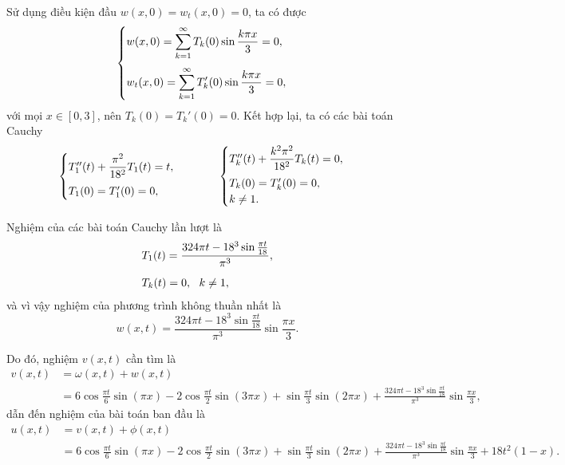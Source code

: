 \documentclass[10pt, a4paper]{article}
\begin{document}
	Sử dụng điều kiện đầu $w(x,0)=w_t(x,0)=0$, ta có được $$\begin{cases}
		w(x,0)=\displaystyle\sum_{k=1}^\infty T_k(0)\sin\frac{k\pi x}{3}=0,\\
		\noalign{\vskip7pt}
		w_t(x,0)=\displaystyle\sum_{k=1}^\infty T_k'(0)\sin\frac{k\pi x}{3}=0,
	\end{cases}$$
	với mọi $x\in[0,3]$, nên $T_k(0)=T_k'(0)=0$. Kết hợp lại, ta có các bài toán Cauchy $$\begin{cases}
		T_1''(t)+\dfrac{\pi^2}{18^2}T_1(t)=t,\\
		\noalign{\vskip5pt}
		T_1(0)=T_1'(0)=0,
	\end{cases}\hspace{1cm}\begin{cases}
		T_k''(t)+\dfrac{k^2\pi^2}{18^2}T_k(t)=0,\\
		\noalign{\vskip5pt}
		T_k(0)=T_k'(0)=0,\\
		k\ne1.
	\end{cases}$$
	
	Nghiệm của các bài toán Cauchy lần lượt là \begin{align*}
		&T_1(t)=\frac{324\pi t-18^3\sin\frac{\pi t}{18}}{\pi^3},\\
		\noalign{\vskip5pt}
		&T_k(t)=0,~~k\ne1,
	\end{align*}
	và vì vậy nghiệm của phương trình không thuần nhất là $$w(x,t)=\frac{324\pi t-18^3\sin\frac{\pi t}{18}}{\pi^3}\sin\frac{\pi x}{3}.$$
	
	Do đó, nghiệm $v(x,t)$ cần tìm là \begin{align*}
		v(x,t)&=\omega(x,t)+w(x,t)\\
		&=6\cos\frac{\pi t}{6}\sin(\pi x)-2\cos\frac{\pi t}{2}\sin(3\pi x)+\sin\frac{\pi t}{3}\sin(2\pi x)+\frac{324\pi t-18^3\sin\frac{\pi t}{18}}{\pi^3}\sin\frac{\pi x}{3},
	\end{align*}
	dẫn đến nghiệm của bài toán ban đầu là \begin{align*}
		u(x,t)&=v(x,t)+\phi(x,t)\\
		&=6\cos\frac{\pi t}{6}\sin(\pi x)-2\cos\frac{\pi t}{2}\sin(3\pi x)+\sin\frac{\pi t}{3}\sin(2\pi x)+\frac{324\pi t-18^3\sin\frac{\pi t}{18}}{\pi^3}\sin\frac{\pi x}{3}+18t^2(1-x).
	\end{align*}
\end{document}
